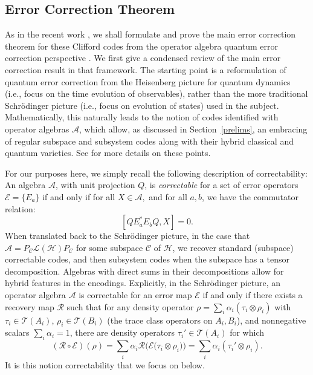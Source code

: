 \documentclass[11pt]{article}
\theoremstyle{definition}
\begin{document}
\subsection{Error Correction Theorem}

As in the recent work \cite{DauphinaiKribsVasmer2024}, we shall formulate and prove the main error correction theorem for these Clifford codes from the operator algebra quantum error correction perspective \cite{Beny2007Generalization,Beny2007Quantum}. We first give a condensed review of the main error correction result in that framework. The starting point is a reformulation of quantum error correction from the Heisenberg picture for quantum dynamics (i.e., focus on the time evolution of observables), rather than the more traditional Schr\"odinger picture (i.e., focus on evolution of states) used in the subject. Mathematically, this naturally leads to the notion of codes identified with operator algebras $\mathcal A$, which allow, as discussed in Section~\ref{prelims}, an embracing of regular subspace and subsystem codes along with their hybrid classical and quantum varieties. See \cite{Beny2007Generalization,Beny2007Quantum,DauphinaiKribsVasmer2024} for more details on these points. 

For our purposes here, we simply recall the following description of correctability: An algebra $\mathcal A$, with unit projection $Q$, is {\it correctable} for a set of error operators $\mathcal E = \{ E_a \}$ if and only if for all $X \in \mathcal A,$ and for all $a,b$, we have the commutator relation: 
\[
    [Q E_a^* E_b Q, X] = 0 . 
\]
When translated back to the Schr\"odinger picture, in the case that $\mathcal A = P_{\mathcal C} \mathcal L(\mathcal H) P_{\mathcal C}$ for some subspace $\mathcal C$ of $\mathcal H$, we recover standard (subspace) correctable codes, and then subsystem codes when the subspace has a tensor decomposition. Algebras with direct sums in their decompositions allow for hybrid features in the encodings. Explicitly, in the Schr\"odinger picture, an operator algebra $\mathcal A$ is correctable for an error map $\mathcal E$ if and only if there exists a recovery map $\mathcal R$ such that for any density operator $\rho = \sum_i \alpha_i (\tau_i \otimes \rho_i)$ with $\tau_i \in \mathcal T(A_i)$, $\rho_i \in \mathcal T(B_i)$ (the trace class operators on $A_i,B_i$), and nonnegative scalars $\sum_i \alpha_i=1$, there are density operators $\tau_i' \in \mathcal T(A_i)$ for which
\[
    (\mathcal R\circ\mathcal E)(\rho) 
    = \sum_i \alpha_i \mathcal R \bigl({\mathcal E \bigl({\tau_i \otimes \rho_i}\bigr)}\bigr) 
    = \sum_i \alpha_i ( \tau_i' \otimes \rho_i).
\]
It is this notion correctability that we focus on below. 
\end{document}
